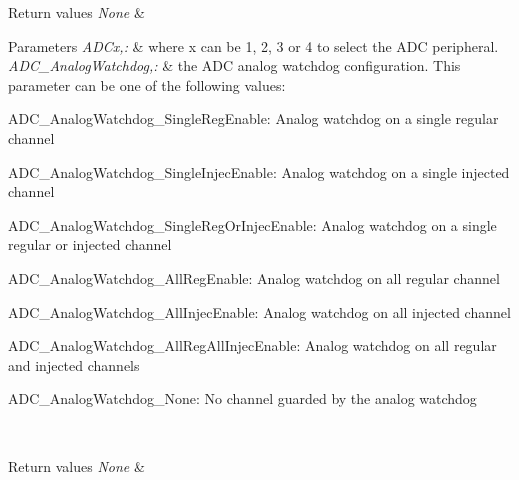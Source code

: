 \begin{DoxyRetVals}{Return values}
{\em None} & \\
\hline
\end{DoxyRetVals}

\begin{DoxyParams}{Parameters}
{\em A\-D\-Cx,\-:} & where x can be 1, 2, 3 or 4 to select the A\-D\-C peripheral. \\
\hline
{\em A\-D\-C\-\_\-\-Analog\-Watchdog,\-:} & the A\-D\-C analog watchdog configuration. This parameter can be one of the following values\-: \begin{DoxyItemize}
\item A\-D\-C\-\_\-\-Analog\-Watchdog\-\_\-\-Single\-Reg\-Enable\-: Analog watchdog on a single regular channel \item A\-D\-C\-\_\-\-Analog\-Watchdog\-\_\-\-Single\-Injec\-Enable\-: Analog watchdog on a single injected channel \item A\-D\-C\-\_\-\-Analog\-Watchdog\-\_\-\-Single\-Reg\-Or\-Injec\-Enable\-: Analog watchdog on a single regular or injected channel \item A\-D\-C\-\_\-\-Analog\-Watchdog\-\_\-\-All\-Reg\-Enable\-: Analog watchdog on all regular channel \item A\-D\-C\-\_\-\-Analog\-Watchdog\-\_\-\-All\-Injec\-Enable\-: Analog watchdog on all injected channel \item A\-D\-C\-\_\-\-Analog\-Watchdog\-\_\-\-All\-Reg\-All\-Injec\-Enable\-: Analog watchdog on all regular and injected channels \item A\-D\-C\-\_\-\-Analog\-Watchdog\-\_\-\-None\-: No channel guarded by the analog watchdog \end{DoxyItemize}
\\
\hline
\end{DoxyParams}

\begin{DoxyRetVals}{Return values}
{\em None} & \\
\hline
\end{DoxyRetVals}

